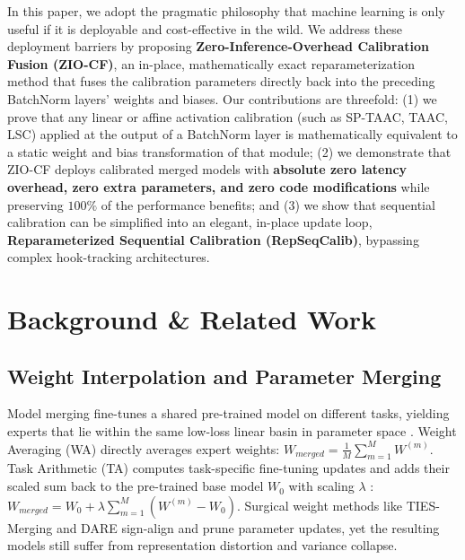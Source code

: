 \documentclass{article}
\begin{document}
In this paper, we adopt the pragmatic philosophy that machine learning is only useful if it is deployable and cost-effective in the wild. We address these deployment barriers by proposing \textbf{Zero-Inference-Overhead Calibration Fusion (ZIO-CF)}, an in-place, mathematically exact reparameterization method that fuses the calibration parameters directly back into the preceding BatchNorm layers' weights and biases. Our contributions are threefold: (1) we prove that any linear or affine activation calibration (such as SP-TAAC, TAAC, LSC) applied at the output of a BatchNorm layer is mathematically equivalent to a static weight and bias transformation of that module; (2) we demonstrate that ZIO-CF deploys calibrated merged models with \textbf{absolute zero latency overhead, zero extra parameters, and zero code modifications} while preserving $100\%$ of the performance benefits; and (3) we show that sequential calibration can be simplified into an elegant, in-place update loop, \textbf{Reparameterized Sequential Calibration (RepSeqCalib)}, bypassing complex hook-tracking architectures.

\section{Background \& Related Work}

\subsection{Weight Interpolation and Parameter Merging}
Model merging fine-tunes a shared pre-trained model on different tasks, yielding experts that lie within the same low-loss linear basin in parameter space \cite{izmailov2018averaging, wortsman2022soups, ainsworth2022git, stoica2023zipit}. Weight Averaging (WA) directly averages expert weights: $W_{merged} = \frac{1}{M} \sum_{m=1}^{M} W^{(m)}$. Task Arithmetic (TA) computes task-specific fine-tuning updates and adds their scaled sum back to the pre-trained base model $W_0$ with scaling $\lambda$ \cite{ilharco2022task}: $W_{merged} = W_0 + \lambda \sum_{m=1}^{M} \left( W^{(m)} - W_0 \right)$. Surgical weight methods like TIES-Merging \cite{yadav2023ties} and DARE \cite{yu2024dare} sign-align and prune parameter updates, yet the resulting models still suffer from representation distortion and variance collapse.
\end{document}
